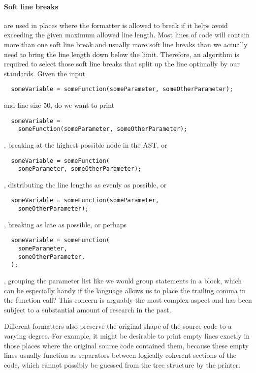 \paragraph{Soft line breaks} are used in places where the formatter is allowed to break
if it helps avoid exceeding the given maximum allowed line length.
Most lines of code will contain more than one soft line break and usually more soft line breaks
than we actually need to bring the line length down below the limit.
Therefore, an algorithm is required to select those soft line breaks
that split up the line optimally by our standards.
Given the input
\begin{verbatim}
  someVariable = someFunction(someParameter, someOtherParameter);
\end{verbatim}
and line size 50, do we want to print
\begin{verbatim}
  someVariable =
    someFunction(someParameter, someOtherParameter);
\end{verbatim}
, breaking at the highest possible node in the AST, or
\begin{verbatim}
  someVariable = someFunction(
    someParameter, someOtherParameter);
\end{verbatim}
, distributing the line lengths as evenly as possible, or
\begin{verbatim}
  someVariable = someFunction(someParameter,
    someOtherParameter);
\end{verbatim}
, breaking as late as possible, or perhaps
\begin{verbatim}
  someVariable = someFunction(
    someParameter,
    someOtherParameter,
  );
\end{verbatim}
, grouping the parameter list like we would group statements in a block,
which can be especially handy if the language allows us to place the trailing comma in the function call?
This concern is arguably the most complex aspect and has been subject to a substantial amount of research in the past.
\autocite{designPrettyPrintingLib}\autocite{prettierPrinter}

\bigbreak{}
Different formatters also preserve the original shape of the source code to a varying degree.
For example, it might be desirable to print empty lines
exactly in those places where the original source code contained them,
\autocite[Section: Empty lines]{prettierRationale}
because these empty lines usually function as separators between logically coherent sections of the code,
which cannot possibly be guessed from the tree structure by the printer.
